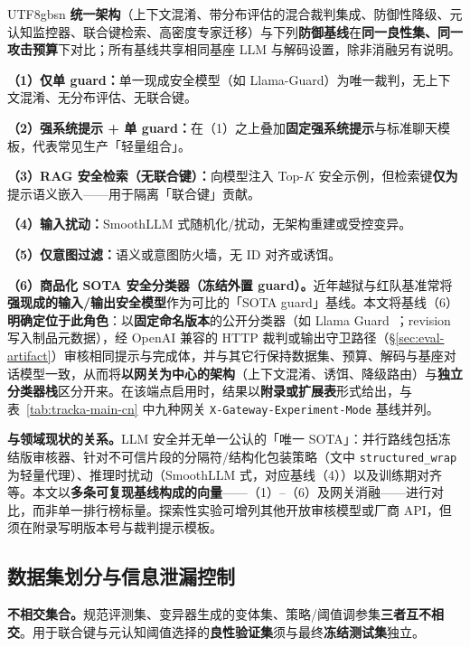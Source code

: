 \documentclass[letterpaper,twocolumn,10pt]{article}
\begin{document}
\begin{CJK}{UTF8}{gbsn}
\textbf{统一架构}（上下文混淆、带分布评估的混合裁判集成、防御性降级、元认知监控器、联合键检索、高密度专家迁移）与下列\textbf{防御基线}在\textbf{同一良性集、同一攻击预算}下对比；所有基线共享相同基座 LLM 与解码设置，除非消融另有说明。

\textbf{（1）仅单 guard：}单一现成安全模型（如 Llama-Guard）为唯一裁判，无上下文混淆、无分布评估、无联合键。

\textbf{（2）强系统提示 + 单 guard：}在（1）之上叠加\textbf{固定强系统提示}与标准聊天模板，代表常见生产「轻量组合」。

\textbf{（3）RAG 安全检索（无联合键）：}向模型注入 Top-$K$ 安全示例，但检索键\textbf{仅为}提示语义嵌入——用于隔离「联合键」贡献。

\textbf{（4）输入扰动：}SmoothLLM 式随机化/扰动，无架构重建或受控变异。

\textbf{（5）仅意图过滤：}语义或意图防火墙，无 ID 对齐或诱饵。

\textbf{（6）商品化 SOTA 安全分类器（冻结外置 guard）。}近年越狱与红队基准常将\textbf{强现成的输入/输出安全模型}作为可比的「SOTA guard」基线。本文将基线（6）\textbf{明确定位于此角色}：以\textbf{固定命名版本}的公开分类器（如 Llama Guard~\cite{llama-guard}；revision 写入制品元数据），经 OpenAI 兼容的 HTTP 裁判或输出守卫路径（\S\ref{sec:eval-artifact}）审核相同提示与完成体，并与其它行保持数据集、预算、解码与基座对话模型一致，从而将\textbf{以网关为中心的架构}（上下文混淆、诱饵、降级路由）与\textbf{独立分类器栈}区分开来。在该端点启用时，结果以\textbf{附录或扩展表}形式给出，与表~\ref{tab:tracka-main-cn} 中九种网关 \texttt{X-Gateway-Experiment-Mode} 基线并列。

\noindent\textbf{与领域现状的关系。}LLM 安全并无单一公认的「唯一 SOTA」：并行路线包括冻结版审核器、针对不可信片段的分隔符/结构化包装策略（文中 \texttt{structured\_wrap} 为轻量代理）、推理时扰动（SmoothLLM 式，对应基线（4））以及训练期对齐等。本文以\textbf{多条可复现基线构成的向量}——（1）--（6）及网关消融——进行对比，而非单一排行榜标量。探索性实验可增列其他开放审核模型或厂商 API，但须在附录写明版本号与裁判提示模板。

\subsection{数据集划分与信息泄漏控制}
\label{sec:eval-splits}

\textbf{不相交集合。}规范评测集、变异器生成的变体集、策略/阈值调参集\textbf{三者互不相交}。用于联合键与元认知阈值选择的\textbf{良性验证集}须与最终\textbf{冻结测试集}独立。


\end{CJK}
\end{document}
